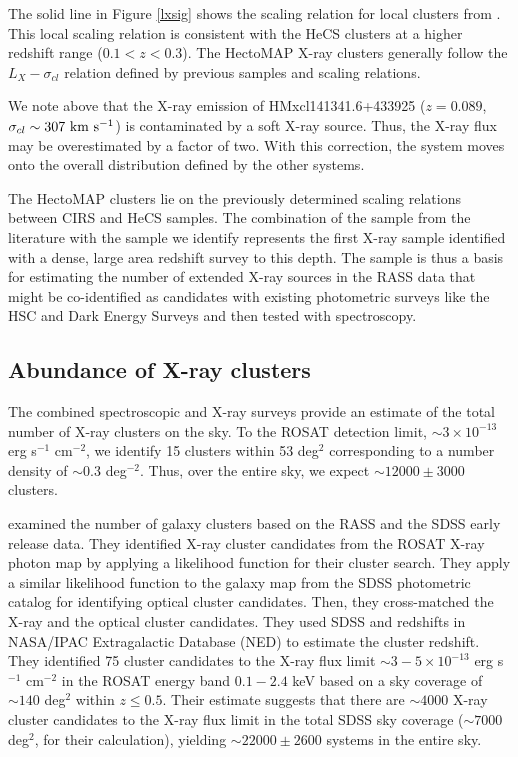 \documentclass[iop, apj]{emulateapj}
\newcommand{\kms}{\rm km~s^{-1}}
\begin{document}
The solid line in Figure \ref{lxsig} shows
 the scaling relation for local clusters from \citet{Zhang11}.
This local scaling relation is consistent with
 the HeCS clusters at a higher redshift range ($0.1 < z < 0.3$). 
The HectoMAP X-ray clusters generally follow 
 the $L_{X} - \sigma_{cl}$ relation 
 defined by previous samples and scaling relations.

We note above that 
 the X-ray emission of HMxcl141341.6+433925 ($z = 0.089$, $\sigma_{cl} \sim 307~\kms$)
 is contaminated by a soft X-ray source. 
Thus, the X-ray flux may be overestimated by a factor of two. 
With this correction, 
 the system moves onto the overall distribution defined by the other systems.

The HectoMAP clusters  
lie on the previously determined scaling relations between CIRS and HeCS samples.
The combination of the sample from the literature
 with the sample we identify 
 represents the first X-ray sample identified with a dense, large area redshift survey to this depth. 
The sample is thus a basis for estimating 
 the number of extended X-ray sources in the RASS data 
 that might be co-identified as candidates with 
 existing photometric surveys like the 
 HSC \citep{Aihara17} and Dark Energy Surveys \citep{DES16} 
 and then tested with spectroscopy.  

 
\subsection{Abundance of X-ray clusters}

The combined spectroscopic and X-ray surveys provide 
 an estimate of the total number of X-ray clusters on the sky. 
To the ROSAT detection limit, 
 $\sim 3 \times 10^{-13}$ erg s$^{-1}$ cm$^{-2}$, 
 we identify 15 clusters within 53 deg$^{2}$
 corresponding to a number density of $\sim 0.3$ deg$^{-2}$. 
Thus, over the entire sky, 
 we expect $\sim12000 \pm 3000$ clusters. 

\citet{Schuecker04} examined the number of galaxy clusters 
 based on the RASS and the SDSS early release data. 
They identified X-ray cluster candidates from the ROSAT X-ray photon map 
 by applying a likelihood function for their cluster search.
They apply a similar likelihood function 
 to the galaxy map from the SDSS photometric catalog 
 for identifying optical cluster candidates.
Then, they cross-matched the X-ray and the optical cluster candidates.
They used SDSS and redshifts in NASA/IPAC Extragalactic Database (NED) to estimate the cluster redshift.
They identified 75 cluster candidates to the X-ray flux limit
 $\sim 3 - 5 \times 10^{-13}$ erg s$^{-1}$ cm$^{-2}$ in the ROSAT energy band $0.1 - 2.4$ keV
 based on a sky coverage of $\sim140$ deg$^{2}$ within $z \leq 0.5$. 
Their estimate suggests that 
 there are $\sim 4000$ X-ray cluster candidates to the X-ray flux limit 
 in the total SDSS sky coverage ($\sim 7000$ deg$^{2}$, for their calculation), 
 yielding $\sim 22000 \pm 2600$ systems in the entire sky. 
 
\end{document}
